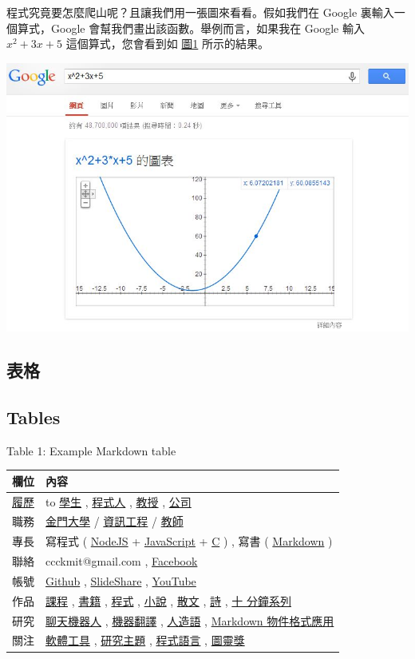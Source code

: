 \documentclass[
  a4paperpaper,
]{article}
\begin{document}
程式究竟要怎麼爬山呢？且讓我們用一張圖來看看。假如我們在 Google
裏輸入一個算式，Google 會幫我們畫出該函數。舉例而言，如果我在 Google
輸入 \(x^2+3x+5\) 這個算式，您會看到如 \protect\hyperlink{image1}{圖1}
所示的結果。

\includegraphics{img/GoogleGraph2D.jpg}

\hypertarget{ux8868ux683c}{%
\subsection{表格}\label{ux8868ux683c}}

\hypertarget{tables}{%
\subsection{Tables}\label{tables}}

Table 1: Example Markdown table

\begin{longtable}[]{@{}ll@{}}
\toprule
欄位 & 內容\tabularnewline
\midrule
\endhead
\href{https://www.cakeresume.com/f5611f}{履歷} & to
\href{cccForStudent.md}{學生} , \href{cccForProgrammer.md}{程式人} ,
\href{cccForProfessor.md}{教授} ,
\href{cccForCompany.md}{公司}\tabularnewline
職務 & \href{http://www.nqu.edu.tw/}{金門大學} /
\href{http://www.nqu.edu.tw/educsie/index.php}{資訊工程} /
\href{http://www.nqu.edu.tw/educsie/index.php?act=blog\&code=list\&ids=4}{教師}\tabularnewline
專長 & 寫程式 ( \href{https://nodejs.org/}{NodeJS} +
\href{js1.md}{JavaScript} + \href{c1.md}{C} ) , 寫書 (
\href{https://zh.wikipedia.org/wiki/Markdown}{Markdown} )\tabularnewline
聯絡 & ccckmit@gmail.com ,
\href{https://www.facebook.com/ccckmit}{Facebook}\tabularnewline
帳號 & \href{https://github.com/ccckmit}{Github} ,
\href{http://www.slideshare.net/ccckmit/}{SlideShare} ,
\href{https://www.youtube.com/user/ccckmit}{YouTube}\tabularnewline
作品 & \href{course.md}{課程} , \href{booklist.md}{書籍} ,
\href{codelist.md}{程式} , \href{novel.md}{小說} ,
\href{article.md}{散文} , \href{../poem/}{詩} , \href{../slide/}{十
分鐘系列}\tabularnewline
研究 & \href{../bot/}{聊天機器人} , \href{../mt/}{機器翻譯} ,
\href{../artilang/}{人造語} , \href{../mdo/}{Markdown
物件格式應用}\tabularnewline
關注 & \href{tool.md}{軟體工具} , \href{topic.md}{研究主題} ,
\href{language.md}{程式語言} ,
\href{turingAward.md}{圖靈獎}\tabularnewline
\bottomrule
\end{longtable}
\end{document}
